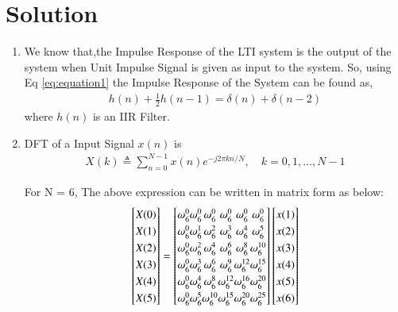 \documentclass[journal,12pt,twocolumn]{IEEEtran}
\renewcommand\thesection{\arabic{section}}
\begin{document}
\section{Solution}
\begin{enumerate}[label=\thesection.\arabic*.,ref=\thesection.\theenumi]
\item
We know that,the Impulse Response of the LTI system is the output of the system when Unit Impulse Signal is given as input to the system.
\newline
So, using Eq \eqref{eq:equation1} the Impulse Response of the System can be found as,
\begin{align}
    h(n) + \frac{1}{2}h(n-1) = \delta(n) + \delta(n-2)	
\end{align}
where $h(n)$ is an IIR Filter.
\item DFT of a Input Signal $x(n)$ is 
\begin{align}
    X(k) \triangleq \sum_{n=0}^{N-1} x(n) e^{-j 2 \pi k n / N}, \quad k=0,1, \ldots, N-1
\end{align}

For N = 6, The above expression can be written in matrix form as below:
\begin{equation}
\renewcommand{\arraystretch}{1.25}
\setlength\arraycolsep{0.01pt}
\begin{bmatrix} 
X(0) \\ X(1) \\ X(2) \\ X(3) \\ X(4) \\ X(5) 
\end{bmatrix}
=
\begin{bmatrix}
\omega^{0}_{6} & \omega^{0}_{6} & \omega^{0}_{6} & \omega^{0}_{6} & \omega^{0}_{6} & \omega^{0}_{6}\\
\omega^{0}_{6} & \omega^{1}_{6} & \omega^{2}_{6} & \omega^{3}_{6} & \omega^{4}_{6} & \omega^{5}_{6}\\
\omega^{0}_{6} & \omega^{2}_{6} & \omega^{4}_{6} & \omega^{6}_{6} & \omega^{8}_{6} & \omega^{10}_{6}\\
\omega^{0}_{6} & \omega^{3}_{6} & \omega^{6}_{6} & \omega^{9}_{6} & \omega^{12}_{6} & \omega^{15}_{6}\\
\omega^{0}_{6} & \omega^{4}_{6} & \omega^{8}_{6} & \omega^{12}_{6} & \omega^{16}_{6} & \omega^{20}_{6}\\
\omega^{0}_{6} & \omega^{5}_{6} & \omega^{10}_{6} & \omega^{15}_{6} & \omega^{20}_{6} & \omega^{25}_{6} 
\end{bmatrix}
\begin{bmatrix}
x(1) \\ x(2) \\ x(3) \\ x(4) \\ x(5) \\x(6)
\end{bmatrix}
\end{equation}


\end{enumerate}
\end{document}
